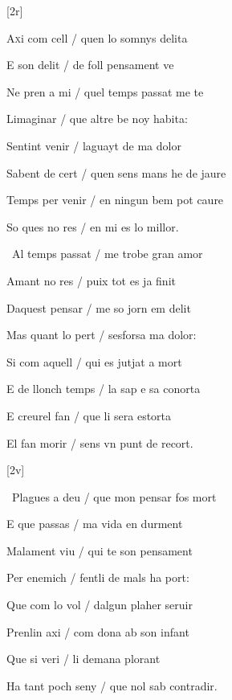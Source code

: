 

[2r]

\begin{estrofa}

 A\textsc{x}i com cell / quen lo somnys delita

 E son delit / de foll pensament ve

 Ne pren a mi / quel temps passat me te

 Limaginar / que altre be noy habita:

 Sentint venir / laguayt de ma dolor

 Sabent de cert / quen sens mans he de jaure

 Temps per venir / en ningun bem pot caure

 So ques no res / en mi es lo millor.

\end{estrofa}



\begin{estrofa}

 \textparagraph\  Al temps passat / me trobe gran amor

 Amant no res / puix tot es ja finit

 Daquest pensar / me so jorn em delit

 Mas quant lo pert / sesforsa ma dolor:

 Si com aquell / qui es jutjat a mort

 E de llonch temps / la sap e sa conorta

 E creurel fan / que li sera estorta

 El fan morir / sens vn punt de recort.

\end{estrofa}


[2v]
\begin{estrofa}

 \textparagraph\  Plagues a deu / que mon pensar fos mort

 E que passas / ma vida en durment

 Malament viu / qui te son pensament

 Per enemich / fentli de mals ha port:

 Que com lo vol / dalgun plaher seruir

 Prenlin axi / com dona ab son infant

 Que si veri / li demana plorant

 Ha tant poch seny / que nol sab contradir.

\end{estrofa}




